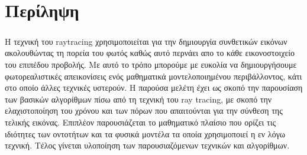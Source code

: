 
\chapter{Περίληψη}

\paragraph{} %

\begin{sloppypar}
Η τεχνική του raytracing χρησιμοποιείται για την δημιουργία συνθετικών εικόνων ακολουθώντας
τη πορεία του φωτός καθώς αυτό περνάει απο το κάθε εικονοστοιχείο του επιπέδου προβολής.
Με αυτό το τρόπο μπορούμε με ευκολία να δημιουργήσουμε φωτορεαλιστικές απεικονίσεις ενός
μαθηματικά μοντελοποιημένου περιβάλλοντος, κάτι στο οποίο άλλες τεχνικές υστερούν. Η 
παρούσα μελέτη έχει ως σκοπό την παρουσίαση των βασικών αλγορίθμων πίσω από τη τεχνική του 
ray tracing, με σκοπό την ελαχιστοποίηση του χρόνου και των πόρων που απαιτούνται για την 
σύνθεση της τελικής εικόνας. Επιπλέον παρουσιάζεται το μαθηματικό πλαίσιο που ορίζει τις 
ιδιότητες των οντοτήτων και τα φυσικά μοντέλα τα οποία χρησιμοποιεί η εν λόγω τεχνική. 
Τέλος γίνεται υλοποίηση των παρουσιαζόμενων τεχνικών και αλγορίθμων.
\end{sloppypar}

